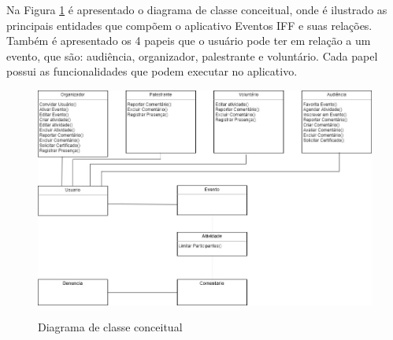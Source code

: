 Na Figura \ref{fig:digrama-classe} é apresentado o diagrama de classe conceitual, onde é ilustrado as principais entidades que compõem o aplicativo Eventos IFF e suas relações. Também é apresentado os 4 papeis que o usuário pode ter em relação a um evento, que são: audiência, organizador, palestrante e voluntário. Cada papel possui as funcionalidades que podem executar no aplicativo.

\begin{figure}[H]
    \centering
    \caption{Diagrama de classe conceitual}
    \includegraphics[scale=0.5]{figuras/diagrama-classe-conceitual.jpg}
    \label{fig:digrama-classe}
\end{figure}